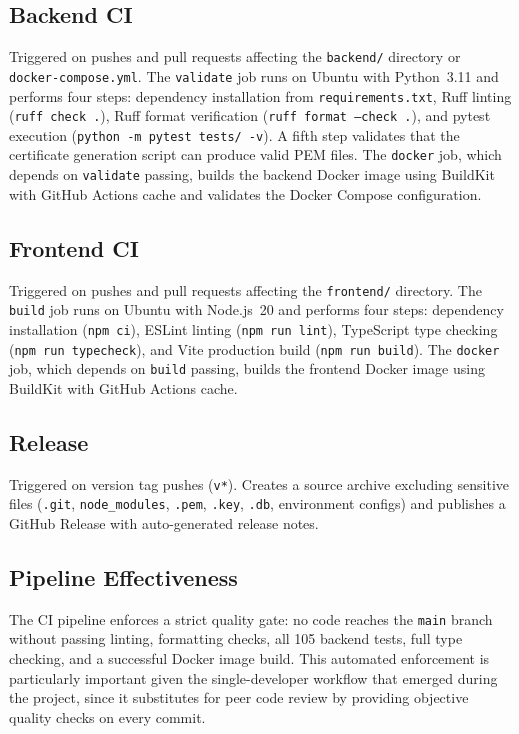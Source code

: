\documentclass[12pt,letterpaper]{report}
\begin{document}
\subsection{Backend CI}

Triggered on pushes and pull requests affecting the \texttt{backend/} directory or \texttt{docker-compose.yml}. The \texttt{validate} job runs on Ubuntu with Python~3.11 and performs four steps: dependency installation from \texttt{requirements.txt}, Ruff linting (\texttt{ruff check .}), Ruff format verification (\texttt{ruff format --check .}), and pytest execution (\texttt{python -m pytest tests/ -v}). A fifth step validates that the certificate generation script can produce valid PEM files. The \texttt{docker} job, which depends on \texttt{validate} passing, builds the backend Docker image using BuildKit with GitHub Actions cache and validates the Docker Compose configuration.

\subsection{Frontend CI}

Triggered on pushes and pull requests affecting the \texttt{frontend/} directory. The \texttt{build} job runs on Ubuntu with Node.js~20 and performs four steps: dependency installation (\texttt{npm ci}), ESLint linting (\texttt{npm run lint}), TypeScript type checking (\texttt{npm run typecheck}), and Vite production build (\texttt{npm run build}). The \texttt{docker} job, which depends on \texttt{build} passing, builds the frontend Docker image using BuildKit with GitHub Actions cache.

\subsection{Release}

Triggered on version tag pushes (\texttt{v*}). Creates a source archive excluding sensitive files (\texttt{.git}, \texttt{node\_modules}, \texttt{.pem}, \texttt{.key}, \texttt{.db}, environment configs) and publishes a GitHub Release with auto-generated release notes.

\subsection{Pipeline Effectiveness}

The CI pipeline enforces a strict quality gate: no code reaches the \texttt{main} branch without passing linting, formatting checks, all 105 backend tests, full type checking, and a successful Docker image build. This automated enforcement is particularly important given the single-developer workflow that emerged during the project, since it substitutes for peer code review by providing objective quality checks on every commit.
\end{document}

